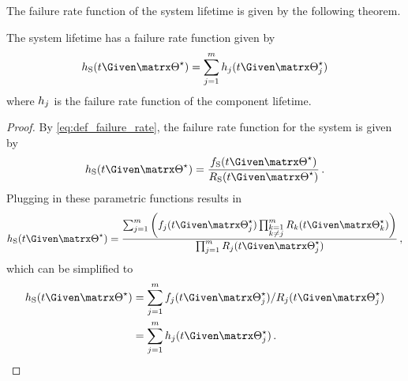 \documentclass[../main.tex]{subfiles}
\begin{document}
The failure rate function of the system lifetime is given by the following theorem.
\begin{theorem}
\label{thm:series_failure_rate_function}
The system lifetime has a failure rate function given by
\begin{equation}
\label{eq:series_failure_rate_function}
    \haz_{\sv}(t \Given \tparam\sysparam) =
        \sum_{j=1}^{m}
            \haz_j(t \Given \tparam{\sysparam}_j)
\end{equation}
where $h_j$ is the failure rate function of the \jth component lifetime.
\end{theorem}
\begin{proof}
By \cref{eq:def_failure_rate}, the failure rate function for the system is given by
\begin{equation}
     \haz_{\sv}(t \Given \tparam\sysparam) = \frac{\spdf(t \Given \tparam\sysparam)}{\srv_{\sv}(t \Given \tparam\sysparam)}\,.
\end{equation}
Plugging in these parametric functions results in
\begin{equation}
\haz_{\sv}(t \Given \tparam{\sysparam}) = \frac{\sum_{j=1}^{m} \left(\pdf_j(t \Given \tparam{\sysparam}_j) \prod_{\substack{k=1\\k \neq j}}^{m} \srv_k(t \Given \tparam{\sysparam}_k)\right )}{\prod_{j=1}^{m} \srv_j(t \Given \tparam{\sysparam}_j)}\,,
\end{equation}
which can be simplified to
\begin{align}
\haz_{\sv}(t \Given \tparam{\sysparam})
    &= \sum_{j=1}^{m} \pdf_j(t \Given \tparam{\sysparam}_j) / \srv_j(t \Given \tparam{\sysparam}_j)\\
    &= \sum_{j=1}^{m} \haz_j(t \Given \tparam{\sysparam}_j)\,.
\end{align}
\end{proof}
\end{document}
